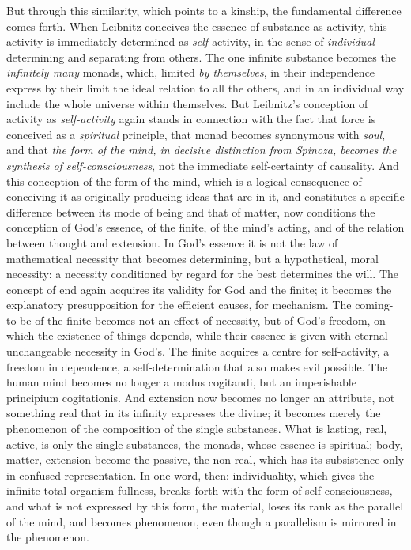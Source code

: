 \documentclass[12pt,a4paper,openany]{book}
\newcommand{\opage}[1]{\marginnote{\footnotesize\textit{[#1]}}}
\begin{document}
But through this similarity, which points to a kinship,
the fundamental difference comes forth. When Leibnitz conceives
the essence of substance as activity, this
activity is immediately determined as \emph{self-}activity, in the sense
of \emph{individual} determining and separating from others. The
one infinite substance becomes the \emph{infinitely many}
monads, which, limited \emph{by themselves}, in their independence
express by their limit the ideal relation
to all the others, and in an individual way include the whole
universe within themselves. But Leibnitz's conception of activity
as \emph{self-activity} again stands in connection with the fact that
\opage{185} force is conceived as a \emph{spiritual} principle, that monad
becomes synonymous with \emph{soul}, and that \emph{the form of the mind,
in decisive distinction from Spinoza, becomes the synthesis of self-consciousness},
not the immediate self-certainty of causality.
And this conception of the form of the mind, which is
a logical consequence of conceiving it as originally
producing ideas that are in it, and constitutes a specific
difference between its mode of being and that of matter, now conditions
the conception of God's essence, of the finite, of the mind's
acting, and of the relation between thought and extension.
In God's essence it is not the law of mathematical necessity
that becomes determining, but a hypothetical, moral necessity:
a necessity conditioned by regard for the best
determines the will. The concept of end again acquires its validity
for God and the finite; it becomes the explanatory
presupposition for the efficient causes, for mechanism.
The coming-to-be of the finite becomes not an effect of necessity,
but of God's freedom, on which the existence of things
depends, while their essence is given with eternal unchangeable
necessity in God's. The finite acquires a
centre for self-activity, a freedom in dependence,
a self-determination that also makes evil possible.
The human mind becomes no longer a modus cogitandi,
but an imperishable principium cogitationis. And
extension now becomes no longer an attribute, not something
real that in its infinity expresses the divine;
it becomes merely the phenomenon of the composition of the single substances.
What is lasting, real, active, is only the
single substances, the monads, whose essence is spiritual;
body, matter, extension become the passive, the non-real,
which has its subsistence only in confused representation. In
one word, then: individuality, which gives the infinite
total organism fullness, breaks forth with the form of self-consciousness,
and what is not expressed by this form, the material,
loses its rank as the parallel of the mind, and becomes
phenomenon, even though a parallelism is mirrored in the phenomenon.
\end{document}
